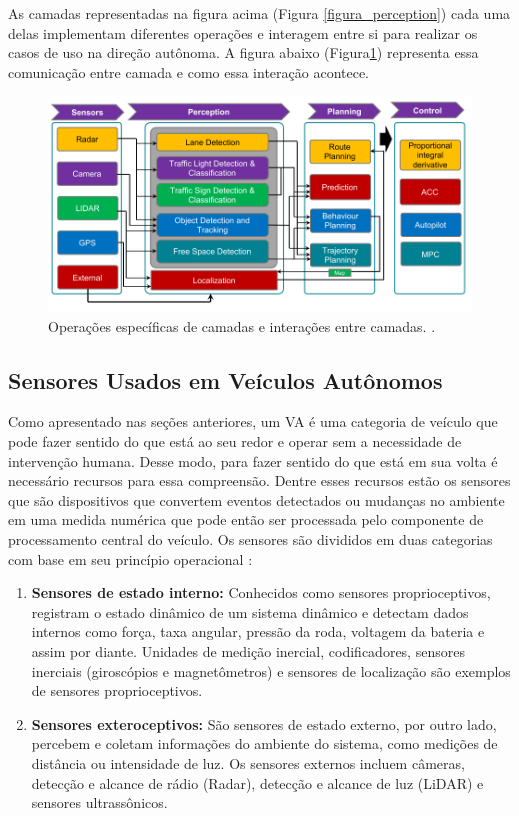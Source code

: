As camadas representadas na figura acima (Figura \ref{figura_perception}) cada uma delas implementam diferentes operações e interagem entre si para realizar os casos de uso na direção autônoma. A figura abaixo (Figura\ref{figura_camadas}) representa essa comunicação entre camada e como essa interação acontece.

\begin{figure}[H]
\centering
\includegraphics[width=\textwidth]{Figures/layer-sens.png}
\caption{Operações específicas de camadas e interações entre camadas. \cite{sensors-yet}.}
\label{figura_camadas}
\end{figure}



\subsection{Sensores Usados em Veículos Autônomos} \label{sensores-a}

Como apresentado nas seções anteriores, um VA é uma categoria de veículo que pode fazer sentido do que está ao seu redor e operar sem a necessidade de intervenção humana. Desse modo, para fazer sentido do que está em sua volta é necessário recursos para essa compreensão. Dentre esses recursos estão os sensores que são dispositivos que convertem eventos detectados ou mudanças no ambiente em uma medida numérica que pode então ser processada pelo componente de processamento central do veículo. 
Os sensores são divididos em duas categorias com base em seu princípio operacional \cite{sensors}: 

\begin{enumerate}
 \item \textbf{Sensores de estado interno:} Conhecidos como sensores proprioceptivos, registram o estado dinâmico de um sistema dinâmico e detectam dados internos como força, taxa angular, pressão da roda, voltagem da bateria e assim por diante. Unidades de medição inercial, codificadores, sensores inerciais (giroscópios e magnetômetros) e sensores de localização são exemplos de sensores proprioceptivos. 
\item \textbf{Sensores exteroceptivos:} São sensores de estado externo, por outro lado, percebem e coletam informações do ambiente do sistema, como medições de distância ou intensidade de luz. Os sensores externos incluem câmeras, detecção e alcance de rádio (Radar), detecção e alcance de luz (LiDAR) e sensores ultrassônicos.

\end{enumerate}



